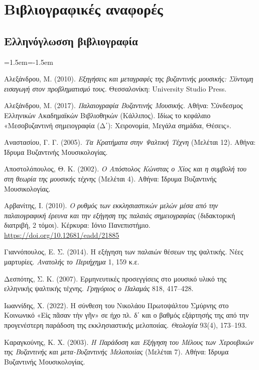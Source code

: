 \documentclass[11pt,a4paper]{article}
\begin{document}
\section*{Βιβλιογραφικές αναφορές}
\small
\setlength{\parindent}{0pt}
\subsection*{Ελληνόγλωσση βιβλιογραφία}
\begin{list}{}{\leftmargin=1.5em\itemindent=-1.5em\itemsep=1pt}
\item Αλεξάνδρου, Μ. (2010). \emph{Εξηγήσεις και μεταγραφές της βυζαντινής μουσικής: Σύντομη εισαγωγή στον προβληματισμό τους}. Θεσσαλονίκη: University Studio Press.
\item Αλεξάνδρου, Μ. (2017). \emph{Παλαιογραφία Βυζαντινής Μουσικής}. Αθήνα: Σύνδεσμος Ελληνικών Ακαδημαϊκών Βιβλιοθηκών (Κάλλιπος). Ιδίως το κεφάλαιο «Μεσοβυζαντινή σημειογραφία (Δ΄): Χειρονομία, Μεγάλα σημάδια, Θέσεις».
\item Αναστασίου, Γ. Γ. (2005). \emph{Τα Κρατήματα στην Ψαλτική Τέχνη} (Μελέται 12). Αθήνα: Ίδρυμα Βυζαντινής Μουσικολογίας.
\item Αποστολόπουλος, Θ. Κ. (2002). \emph{Ο Απόστολος Κώνστας ο Χίος και η συμβολή του στη θεωρία της μουσικής τέχνης} (Μελέται 4). Αθήνα: Ίδρυμα Βυζαντινής Μουσικολογίας.
\item Αρβανίτης, Ι. (2010). \emph{Ο ρυθμός των εκκλησιαστικών μελών μέσα από την παλαιογραφική έρευνα και την εξήγηση της παλαιάς σημειογραφίας} (διδακτορική διατριβή, 2 τόμοι). Κέρκυρα: Ιόνιο Πανεπιστήμιο. \url{https://doi.org/10.12681/eadd/21885}
\item Γιαννόπουλος, Ε. Σ. (2014). Η εξήγηση των παλαιών θέσεων της ψαλτικής. Νέες μαρτυρίες. \emph{Ανατολής το Περιήχημα} 1, 159 κ.ε.
\item Δεσπότης, Σ. Κ. (2007). Ερμηνευτικές προσεγγίσεις στο μουσικό υλικό της ελληνικής ψαλτικής τέχνης. \emph{Γρηγόριος ο Παλαμάς} 818, 417--428.
\item Ιωαννίδης, Χ. (2022). Η σύνθεση του Νικολάου Πρωτοψάλτου Σμύρνης στο Κοινωνικό «Εἰς πᾶσαν τὴν γῆν» σε ήχο πλ. δ΄ και ο βαθμός εξάρτησής της από την προγενέστερη παράδοση της εκκλησιαστικής μελοποιίας. \emph{Θεολογία} 93(4), 173--193.
\item Καραγκούνης, Κ. Χ. (2003). \emph{Η Παράδοση και Εξήγηση του Μέλους των Χερουβικών της Βυζαντινής και μετα-Βυζαντινής Μελοποιίας} (Μελέται 7). Αθήνα: Ίδρυμα Βυζαντινής Μουσικολογίας.

\end{list}
\end{document}
